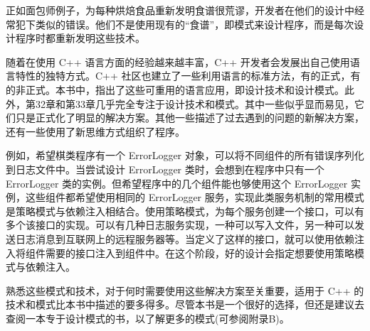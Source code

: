 正如面包师例子，为每种烘焙食品重新发明食谱很荒谬，开发者在他们的设计中经常犯下类似的错误。他们不是使用现有的“食谱”，即模式来设计程序，而是每次设计程序时都重新发明这些技术。

随着在使用 C++ 语言方面的经验越来越丰富，C++ 开发者会发展出自己使用语言特性的独特方式。C++ 社区也建立了一些利用语言的标准方法，有的正式，有的非正式。本书中，指出了这些可重用的语言应用，即设计技术和设计模式。此外，第32章和第33章几乎完全专注于设计技术和模式。其中一些似乎显而易见，它们只是正式化了明显的解决方案。其他一些描述了过去遇到的问题的新解决方案，还有一些使用了新思维方式组织了程序。

例如，希望棋类程序有一个 ErrorLogger 对象，可以将不同组件的所有错误序列化到日志文件中。当尝试设计 ErrorLogger 类时，会想到在程序中只有一个 ErrorLogger 类的实例。但希望程序中的几个组件能也够使用这个 ErrorLogger 实例，这些组件都希望使用相同的 ErrorLogger 服务，实现此类服务机制的常用模式是策略模式与依赖注入相结合。使用策略模式，为每个服务创建一个接口，可以有多个该接口的实现。可以有几种日志服务实现，一种可以写入文件，另一种可以发送日志消息到互联网上的远程服务器等。当定义了这样的接口，就可以使用依赖注入将组件需要的接口注入到组件中。在这个阶段，好的设计会指定想要使用策略模式与依赖注入。

熟悉这些模式和技术，对于何时需要使用这些解决方案至关重要，适用于 C++ 的技术和模式比本书中描述的要多得多。尽管本书是一个很好的选择，但还是建议去查阅一本专于设计模式的书，以了解更多的模式(可参阅附录B)。



















